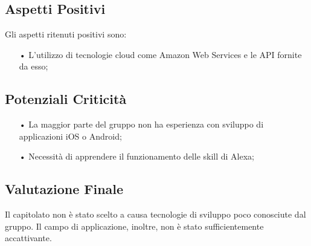 \subsection{Aspetti Positivi}
Gli aspetti ritenuti positivi sono:
\begin{itemize}
\item[•] L'utilizzo di tecnologie cloud come Amazon Web Services e le API fornite da esso;
\end{itemize}

\subsection{Potenziali Criticità}
\begin{itemize}
\item[•] La maggior parte del gruppo non ha esperienza con sviluppo di applicazioni iOS o Android;
\item[•] Necessità di apprendere il funzionamento delle skill di Alexa;
\end{itemize}

\subsection{Valutazione Finale}
Il capitolato non è stato scelto a causa tecnologie di sviluppo poco conosciute dal gruppo. Il campo di applicazione, inoltre, non è stato sufficientemente accattivante.
